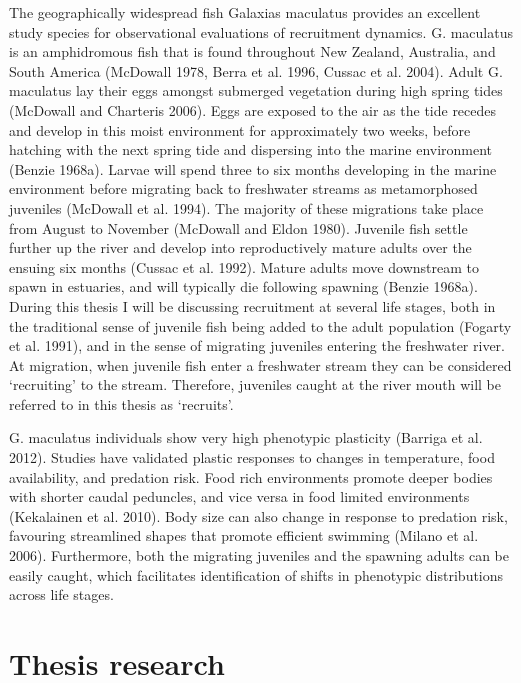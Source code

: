 \documentclass[]{book}
\begin{document}
The geographically widespread fish Galaxias maculatus provides an
excellent study species for observational evaluations of recruitment
dynamics. G. maculatus is an amphidromous fish that is found throughout
New Zealand, Australia, and South America (McDowall 1978, Berra et al.
1996, Cussac et al. 2004). Adult G. maculatus lay their eggs amongst
submerged vegetation during high spring tides (McDowall and Charteris
2006). Eggs are exposed to the air as the tide recedes and develop in
this moist environment for approximately two weeks, before hatching with
the next spring tide and dispersing into the marine environment (Benzie
1968a). Larvae will spend three to six months developing in the marine
environment before migrating back to freshwater streams as metamorphosed
juveniles (McDowall et al. 1994). The majority of these migrations take
place from August to November (McDowall and Eldon 1980). Juvenile fish
settle further up the river and develop into reproductively mature
adults over the ensuing six months (Cussac et al. 1992). Mature adults
move downstream to spawn in estuaries, and will typically die following
spawning (Benzie 1968a). During this thesis I will be discussing
recruitment at several life stages, both in the traditional sense of
juvenile fish being added to the adult population (Fogarty et al. 1991),
and in the sense of migrating juveniles entering the freshwater river.
At migration, when juvenile fish enter a freshwater stream they can be
considered `recruiting' to the stream. Therefore, juveniles caught at
the river mouth will be referred to in this thesis as `recruits'.

G. maculatus individuals show very high phenotypic plasticity (Barriga
et al. 2012). Studies have validated plastic responses to changes in
temperature, food availability, and predation risk. Food rich
environments promote deeper bodies with shorter caudal peduncles, and
vice versa in food limited environments (Kekalainen et al. 2010). Body
size can also change in response to predation risk, favouring
streamlined shapes that promote efficient swimming (Milano et al. 2006).
Furthermore, both the migrating juveniles and the spawning adults can be
easily caught, which facilitates identification of shifts in phenotypic
distributions across life stages.

\section{Thesis research}\label{thesis-research}
\end{document}
